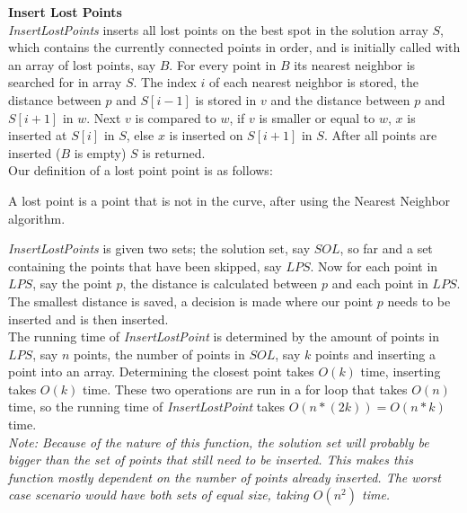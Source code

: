     \noindent\textbf{Insert Lost Points}\\
        \noindent\emph{InsertLostPoints} inserts all lost points on the best spot in the solution array $S$, which contains the currently connected points in order, and is initially called with an array of lost points, say $B$. For every point in $B$ its nearest neighbor is searched for in array $S$. The index $i$ of each nearest neighbor is stored, the distance between $p$ and $S[i-1]$ is stored in $v$ and the distance between $p$ and $S[i+1]$ in $w$. Next $v$ is compared to $w$, if $v$ is smaller or equal to $w$, $x$ is inserted at $S[i]$ in $S$, else $x$ is inserted on $S[i+1]$ in $S$. After all points are inserted ($B$ is empty) $S$ is returned.\\
        Our definition of a lost point point is as follows:\\
        \begin{definition} \label{def:ilp}
          A lost point is a point that is not in the curve, after using the Nearest Neighbor algorithm.
        \end{definition}
        \textit{InsertLostPoints} is given two sets; the solution set, say $SOL$, so far and a set containing the points that have been skipped, say $LPS$. Now for each point in $LPS$, say the point $p$, the distance is calculated between $p$ and each point in $LPS$. The smallest distance is saved, a decision is made where our point $p$ needs to be inserted and is then inserted.\\
        The running time of \textit{InsertLostPoint} is determined by the amount of points in $LPS$, say $n$ points, the number of points in $SOL$, say $k$ points and inserting a point into an array. Determining the closest point takes $O(k)$ time, inserting takes $O(k)$ time. These two operations are run in a for loop that takes $O(n)$ time, so the running time of \textit{InsertLostPoint} takes $O(n*(2k)) = O(n*k)$ time.\\
        \emph{Note: Because of the nature of this function, the solution set will probably be bigger than the set of points that still need to be inserted. This makes this function mostly dependent on the number of points already inserted. The worst case scenario would have both sets of equal size, taking $O(n^{2})$ time.}\\


